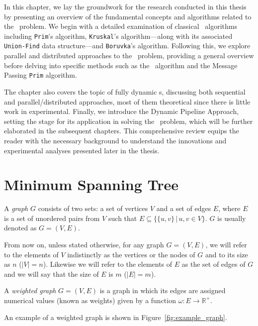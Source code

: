 In this chapter, we lay the groundwork for the research conducted in this thesis by presenting an overview of the fundamental concepts and algorithms related to the \mst\ problem. We begin with a detailed examination of classical \mst\ algorithms including {\tt Prim}'s algorithm, {\tt Kruskal}'s algorithm—along with its associated {\tt Union-Find} data structure—and {\tt Boruvka}'s algorithm. Following this, we explore parallel and distributed approaches to the \mst\ problem, providing a general overview before delving into specific methods such as the \FKruskal\ algorithm and the Message Passing {\tt Prim} algorithm.

The chapter also covers the topic of fully dynamic {\mst}s, discussing both sequential and parallel/distributed approaches, most of them theoretical since there is little work in experimental. Finally, we introduce the Dynamic Pipeline Approach, setting the stage for its application in solving the \mst\ problem, which will be further elaborated in the subsequent chapters. This comprehensive review equips the reader with the necessary background to understand the innovations and experimental analyses presented later in the thesis.

\section{Minimum Spanning Tree}

\begin{definition} \label{def:graph}
A \textit{graph} $G$ consists of two sets: a set of vertices $V$ and a set of edges $E$, where $E$ is a set of unordered 
pairs from $V$ such that $E \subseteq \{\{u,v\}\,|\,u,v\in V\}$. $G$ is usually denoted as $G=(V,E)$. 
\end{definition}

From now on, unless stated otherwise, for any graph $G=(V,E)$, we will refer to the elements of $V$ indistinctly as the vertices or the nodes of $G$ and to its size as $n$ ($|V| = n$). 
Likewise we will refer to the elements of $E$ as the set of edges of $G$ and we will say that the size of $E$ is $m$ ($|E| = m$). 


\begin{definition} \label{def:wgraph}
A \textit{weighted graph} $G= (V,E)$ is a graph in which its edges are assigned numerical values (known as weights) given by a function $\omega: E \rightarrow \mathbb{R}^+$.
\end{definition}

An example of a weighted graph is shown in Figure~\ref{fig:example_graph}. 

